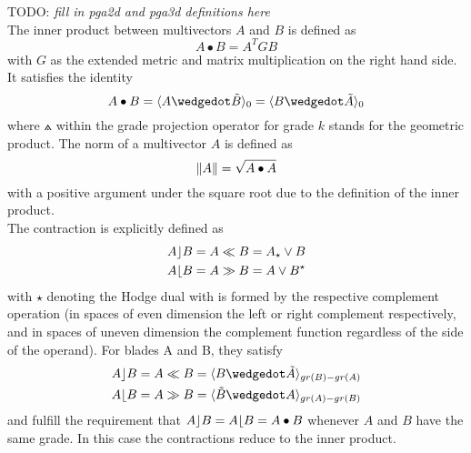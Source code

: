 TODO: \emph{fill in pga2d and pga3d definitions here} \\


The inner product between multivectors $A$ and $B$ is defined as
\begin{equation}
    A \bullet B = A^{T} G B
    \label{eg:inner_product_metric}
\end{equation}
with $G$ as the extended metric and matrix multiplication on the right hand side. It
satisfies the identity
\begin{equation}
    A \bullet B  = \grprj{A \wedgedot \tilde{B}}{0} = \grprj{ B \wedgedot \tilde{A} }{0}
    \label{eq:inner_product_link_to_gpr}
\end{equation}
where $\wedgedot$ within the grade projection operator  for grade $k$ stands
for the geometric product. The norm of a multivector $A$ is defined as
\begin{equation}
    \left \lVert {A} \right \rVert = \sqrt{A \bullet A}
    \label{eq:norm_mv}
\end{equation}
with a positive argument under the square root due to the definition of the inner product.
\\

The contraction is explicitly defined as
\begin{subequations}
    \begin{align}
    A \rfloor B & = A \ll B = A_{\star} \vee B
    \label{eq:lcontr} \\
    A \lfloor B & = A \gg B = A \vee B^{\star}
    \label{eq:rcontr}
    \end{align}
\end{subequations}
with $\star$ denoting the Hodge dual with is formed by the respective complement operation
(in spaces of even dimension the left or right complement respectively, and in spaces of
uneven dimension the complement function regardless of the side of the operand). For
blades A and B, they satisfy
\begin{subequations}
    \begin{align}
    A \lcontr B &  = A \ll B = \grprj{B \wedgedot \tilde{A}}{gr(B)-gr(A)}
    \label{eq:lcontr_gpr} \\
    A \rcontr B & = A \gg B = \grprj{\tilde{B} \wedgedot A}{gr(A)-gr(B)}
    \label{eq:rcontr_gpr}
    \end{align}
\end{subequations}
and fulfill the requirement that $A \rfloor B = A \lfloor B = A \bullet B$ whenever $A$
and $B$ have the same grade. In this case the contractions reduce to the inner product. \\


